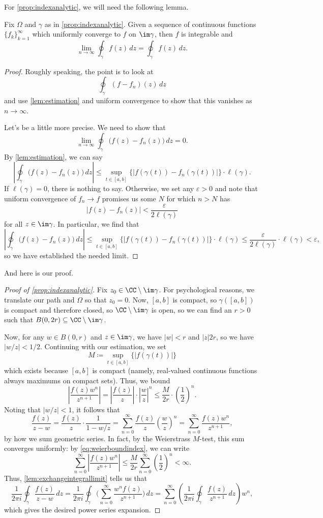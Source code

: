 For \autoref{prop:indexanalytic}, we will need the following lemma.
\begin{lemma} \label{lem:exchangeintegrallimit}
	Fix $\Omega$ and $\gamma$ as in \autoref{prop:indexanalytic}. Given a sequence of continuous functions $\{f_k\}_{k=1}^\infty$ which uniformly converge to $f$ on $\im\gamma$, then $f$ is integrable and
	\[\lim_{n\to\infty}\oint_\gamma f(z)\,dz=\oint_\gamma f(z)\,dz.\]
\end{lemma}
\begin{proof}
	Roughly speaking, the point is to look at
	\[\oint_\gamma(f-f_n)(z)\,dz\]
	and use \autoref{lem:estimation} and uniform convergence to show that this vanishes as $n\to\infty$.

	Let's be a little more precise. We need to show that
	\[\lim_{n\to\infty}\oint_\gamma\big(f(z)-f_n(z)\big)\,dz=0.\]
	By \autoref{lem:estimation}, we can say
	\[\left|\oint_\gamma\big(f(z)-f_n(z)\big)\,dz\right|\le\sup_{t\in[a,b]}\{|f(\gamma(t))-f_n(\gamma(t))|\}\cdot\ell(\gamma).\]
	If $\ell(\gamma)=0$, there is nothing to say. Otherwise, we set any $\varepsilon>0$ and note that uniform convergence of $f_n\to f$ promises us some $N$ for which $n>N$ has
	\[|f(z)-f_n(z)|<\frac{\varepsilon}{2\ell(\gamma)}\]
	for all $z\in\im\gamma$. In particular, we find that
	\[\left|\oint_\gamma\big(f(z)-f_n(z)\big)\,dz\right|\le\sup_{t\in[a,b]}\{|f(\gamma(t))-f_n(\gamma(t))|\}\cdot\ell(\gamma)\le\frac\varepsilon{2\ell(\gamma)}\cdot\ell(\gamma)<\varepsilon,\]
	so we have established the needed limit.
\end{proof}
And here is our proof.
\begin{proof}[Proof of \autoref{prop:indexanalytic}]
	Fix $z_0\in\CC\setminus\im\gamma$. For psychological reasons, we translate our path and $\Omega$ so that $z_0=0$. Now, $[a,b]$ is compact, so $\gamma([a,b])$ is compact and therefore closed, so $\CC\setminus\im\gamma$ is open, so we can find an $r>0$ such that $B(0,2r)\subseteq\CC\setminus\im\gamma$.

	Now, for any $w\in B(0,r)$ and $z\in\im\gamma$, we have $|w|<r$ and $|z|2r$, so we have $|w/z|<1/2$. Continuing with our estimation, we set
	\[M\coloneqq \sup_{t\in[a,b]}\{|f(\gamma(t))|\}\]
	which exists because $[a,b]$ is compact (namely, real-valued continuous functions always maximums on compact sets). Thus, we bound
	\[\left|\frac{f(z)w^n}{z^{n+1}}\right|=\left|\frac{f(z)}z\right|\cdot\left|\frac wz\right|^n\le\frac M{2r}\cdot\left(\frac12\right)^n.\tag{$*$}\label{eq:weierboundindex}\]
	Noting that $|w/z|<1$, it follows that
	\[\frac{f(z)}{z-w}=\frac{f(z)}z\cdot\frac1{1-w/z}=\sum_{n=0}^\infty\frac{f(z)}z\left(\frac wz\right)^n=\sum_{n=0}^\infty\frac{f(z)w^n}{z^{n+1}},\]
	by how we sum geometric series. In fact, by the Weierstrass $M$-test, this sum converges uniformly: by \autoref{eq:weierboundindex}, we can write
	\[\sum_{n=0}^\infty\left|\frac{f(z)w^n}{z^{n+1}}\right|\le\frac M{2r}\sum_{n=0}^\infty\left(\frac12\right)^n<\infty.\]
	Thus, \autoref{lem:exchangeintegrallimit} tells us that
	\[\frac1{2\pi i}\oint_\gamma\frac{f(z)}{z-w}\,dz=\frac1{2\pi i}\oint_\gamma\Bigg(\sum_{n=0}^\infty\frac{w^nf(z)}{z^{n+1}}\Bigg)\,dz=\sum_{n=0}^\infty\left(\frac1{2\pi i}\oint_\gamma\frac{f(z)}{z^{n+1}}\,dz\right)w^n,\]
	which gives the desired power series expansion.
\end{proof}